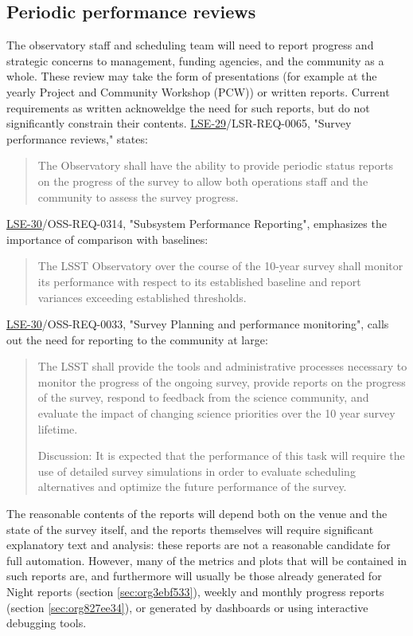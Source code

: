 \subsection{Periodic performance reviews}
\label{sec:org3fdb0b0}
The observatory staff and scheduling team will need to report progress and strategic concerns to management, funding agencies, and the community as a whole.
These review may take the form of presentations (for example at the yearly Project and Community Workshop (PCW)) or written reports.
Current requirements as written acknoweldge the need for such reports, but do not significantly constrain their contents. 
\href{https://ls.st/lse-29}{LSE-29}/LSR-REQ-0065, "Survey performance reviews," states:
\begin{quote}
The Observatory shall have the ability to provide periodic status
reports on the progress of the survey to allow both operations staff
and the community to assess the survey progress.
\end{quote}
\href{https://ls.st/lse-30}{LSE-30}/OSS-REQ-0314, "Subsystem Performance Reporting", emphasizes the importance of comparison with baselines:
\begin{quote}
The LSST Observatory over the course of the 10-year survey shall monitor its performance with respect to its established baseline and report variances exceeding established thresholds.
\end{quote}
\href{https://ls.st/lse-30}{LSE-30}/OSS-REQ-0033, "Survey Planning and performance monitoring", calls out the need for reporting to the community at large:
\begin{quote}
The LSST shall provide the tools and administrative processes
necessary to monitor the progress of the ongoing survey, provide
reports on the progress of the survey, respond to feedback from the
science community, and evaluate the impact of changing science
priorities over the 10 year survey lifetime.

Discussion: It is expected that the performance of this task will
require the use of detailed survey simulations in order to evaluate
scheduling alternatives and optimize the future performance of the
survey.
\end{quote}

The reasonable contents of the reports will depend both on the venue and the state of the survey itself, and the reports themselves will require significant explanatory text and analysis: these reports are not a reasonable candidate for full automation.
However, many of the metrics and plots that will be contained in such reports are, and furthermore will usually be those already generated for Night reports (section \ref{sec:org3ebf533}), weekly and monthly progress reports (section \ref{sec:org827ee34}), or generated by dashboards or using interactive debugging tools.

